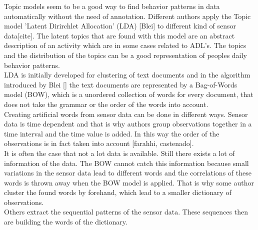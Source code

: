 Topic models seem to be a good way to find behavior patterns in data automatically without the need of annotation. Different authors apply the Topic model 'Latent Dirirchlet Allocation' (LDA) [Blei] to different kind of sensor data[cite]. The latent topics that are found with this model are an abstract description of an activity which are in some cases related to ADL's. The topics and the distribution of the topics can be a good representation of peoples daily behavior patterns.\\
LDA is initially developed for clustering of text documents and in the algorithm introduced by Blei [] the text documents are represented by a Bag-of-Words model (BOW), which is a unordered collection of words for every document, that does not take the grammar or the order of the words into account.\\
Creating artificial words from sensor data can be done in different ways. Sensor data is time dependent and that is why authors group  observations together in a time interval and the time value is added. In this way the order of the observations is in fact taken into account [farahhi, castenado]. \\
It is often the case that not a lot data is available. Still there exists a lot of information of the data. The BOW cannot catch this information because small variations in the sensor data lead to different words and the correlations of these words is thrown away when the BOW model is applied. That is why some author cluster the found words by forehand, which lead to a smaller dictionary of observations.\\
Others extract the sequential patterns of the sensor data. These sequences then are building the words of the dictionary.

